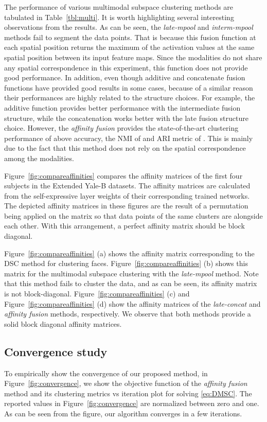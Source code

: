 \documentclass[journal]{IEEEtran}
\begin{document}
The performance of various multimodal subspace clustering methods are tabulated in Table~\ref{tbl:multi}.	  It is worth highlighting several interesting observations from the results.   As can be seen, the \textit{late-mpool} and \textit{interm-mpool} methods fail to segment the data points.  	That is because this fusion function at each spatial position returns the maximum of the activation values at the same spatial position between its input feature maps.  Since the modalities do not share any spatial correspondence in this experiment, this function does not provide good performance.   In addition,  even though additive and concatenate fusion functions have provided good results in some cases, because of a similar reason their performances are highly related to the structure choices.  For example, the additive function provides better performance with the intermediate fusion structure, while the concatenation works better with the late fusion structure choice.     However,  the \textit{affinity fusion} provides the state-of-the-art clustering performance of above  accuracy, the NMI of  and ARI metric of .   This is mainly due to the fact that this method does not rely on the spatial correspondence among the modalities. 
 
Figure~\ref{fig:compareaffinities} compares the affinity matrices of the first four subjects in the Extended Yale-B datasets.  The affinity matrices are calculated from the self-expressive layer weights of their corresponding trained networks.      The depicted affinity matrices in these figures are the result of a permutation being applied on the matrix so that data points of the same clusters are alongside each other.   With this arrangement, a perfect affinity matrix should be block diagonal. 

Figure~\ref{fig:compareaffinities} (a) shows the affinity matrix corresponding to the DSC method for clustering faces.   Figure~\ref{fig:compareaffinities} (b) shows this matrix for the multimodal subspace clustering with the \textit{late-mpool} method.  Note that this method fails to cluster the data, and as can be seen, its affinity matrix is not block-diagonal.      Figure~\ref{fig:compareaffinities} (c) and Figure~\ref{fig:compareaffinities} (d) show the affinity matrices of the \textit{late-concat} and \textit{affinity fusion} methods, respectively.  We observe that both methods provide a solid block diagonal affinity matrices.

\subsection{Convergence study}
To empirically show the convergence of our proposed method, in Figure~\ref{fig:convergence}, we show the objective function of the \emph{affinity fusion} method and its clustering metrics vs iteration plot for solving \eqref{eq:DMSC}.  The reported values in Figure~\ref{fig:convergence} are normalized between zero and one.   As can be seen from the figure, our algorithm converges in a few iterations.
\end{document}
